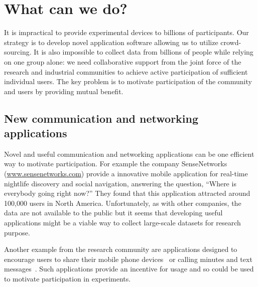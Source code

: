 \documentclass{sig-alternate-10pt}
\begin{document}
\section{What can we do?}
\vspace{-2mm}
It is impractical to provide experimental devices to billions of
participants. Our strategy is to develop novel application software
allowing us to utilize crowd-sourcing.  It is also impossible to
collect data from billions of people while relying on one group alone:
we need collaborative support from the joint force of the research and
industrial communities to achieve active participation of sufficient
individual users.  The key problem is to motivate participation of the
community and users by providing mutual benefit.
\vspace{-1mm}
\subsection{New communication and networking applications }
\vspace{-1mm}
Novel and useful communication and networking applications can be one
efficient way to motivate participation. For example the company
SenseNetworks \\(\url{www.sensenetworks.com}) provide a
innovative mobile application for real-time nightlife discovery and
social navigation, answering the question, ``Where is everybody going
right now?''  They found that this application attracted around
100,000 users in North America.  Unfortunately, as with other
companies, the data are not available to the public but it seems that
developing useful applications might be a viable way to collect
large-scale datasets for research purpose.

Another example from the research community are applications designed
to encourage users to share their mobile phone
devices~\cite{liu:xshare} or calling minutes and text
messages~\cite{psn-shair}. Such applications provide an incentive for
usage and so could be used to motivate participation in experiments.
\vspace{-1mm}
\end{document}
